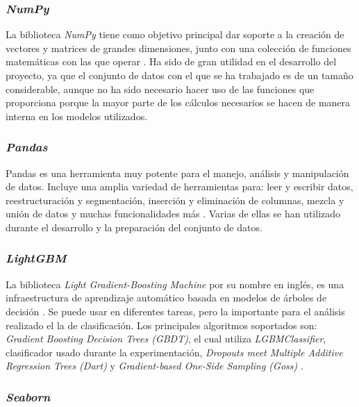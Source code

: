 \subsubsection{\textit{NumPy}}
\label{subsubsec:numpy}

La biblioteca \textit{NumPy} tiene como objetivo principal dar soporte a la creación de vectores y matrices de grandes dimensiones, junto con una colección de funciones matemáticas con las que operar \cite{numpy}. Ha sido de gran utilidad en el desarrollo del proyecto, ya que el conjunto de datos con el que se ha trabajado es de un tamaño considerable, aunque no ha sido necesario hacer uso de las funciones que proporciona porque la mayor parte de los cálculos necesarios se hacen de manera interna en los modelos utilizados.

\subsubsection{\textit{Pandas}}
\label{subsubsec:pandas}

Pandas es una herramienta muy potente para el manejo, análisis y manipulación de datos. Incluye una amplia variedad de herramientas para: leer y escribir datos, reestructuración y segmentación, inserción y eliminación de columnas, mezcla y unión de datos y muchas funcionalidades más \cite{pandas}. Varias de ellas se han utilizado durante el desarrollo y la preparación del conjunto de datos.

\subsubsection{\textit{LightGBM}}
\label{subsubsec:lightgbm}

La biblioteca \textit{Light Gradient-Boosting Machine} por su nombre en inglés, es una infraestructura de aprendizaje automático basada en modelos de árboles de decisión \cite{lgbm}. Se puede usar en diferentes tareas, pero la importante para el análisis realizado el la de clasificación. Los principales algoritmos soportados son: \textit{Gradient Boosting Decision Trees (GBDT)}, el cual utiliza \textit{LGBMClassifier}, clasificador usado durante la experimentación, \textit{Dropouts meet Multiple Additive Regression Trees (Dart)} y \textit{Gradient-based One-Side Sampling (Goss)} \cite{lgbm_alg}.

\subsubsection{\textit{Seaborn}}
\label{subsubsec:seaborn}

